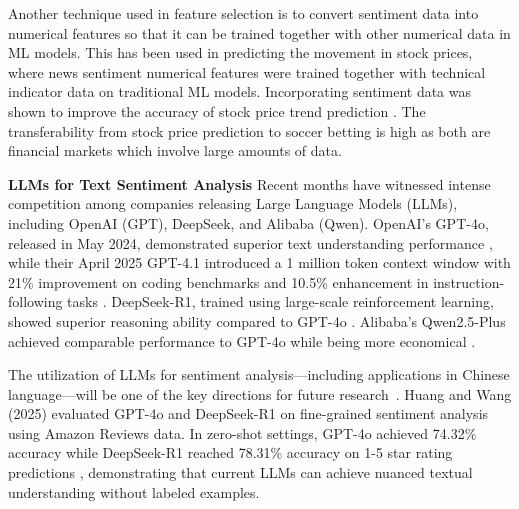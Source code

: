 \documentclass[conference]{IEEEtran}
\begin{document}
Another technique used in feature selection is to convert sentiment data into numerical features so that it can be trained together with other numerical data in ML models. This has been used in predicting the movement in stock prices, where news sentiment numerical features were trained together with technical indicator data on traditional ML models. Incorporating sentiment data was shown to improve the accuracy of stock price trend prediction \cite{attanasio2019combining}. The transferability from stock price prediction to soccer betting is high as both are financial markets which involve large amounts of data.

\noindent\textbf{LLMs for Text Sentiment Analysis}
Recent months have witnessed intense competition among companies releasing Large Language Models (LLMs), including OpenAI (GPT), DeepSeek, and Alibaba (Qwen). OpenAI's GPT-4o, released in May 2024, demonstrated superior text understanding performance \cite{islam2024gpt4o}, while their April 2025 GPT-4.1 introduced a 1 million token context window with 21\% improvement on coding benchmarks and 10.5\% enhancement in instruction-following tasks \cite{openai2025gpt41}. DeepSeek-R1, trained using large-scale reinforcement learning, showed superior reasoning ability compared to GPT-4o \cite{deepseek2025r1}. Alibaba's Qwen2.5-Plus achieved comparable performance to GPT-4o while being more economical \cite{qwen2025technical}.

The utilization of LLMs for sentiment analysis—including applications in Chinese language—will be one of the key directions for future research~\cite{wang2025review}. Huang and Wang (2025) evaluated GPT-4o and DeepSeek-R1 on fine-grained sentiment analysis using Amazon Reviews data. In zero-shot settings, GPT-4o achieved 74.32\% accuracy while DeepSeek-R1 reached 78.31\% accuracy on 1-5 star rating predictions \cite{huang2025explainable}, demonstrating that current LLMs can achieve nuanced textual understanding without labeled examples.

\end{document}
